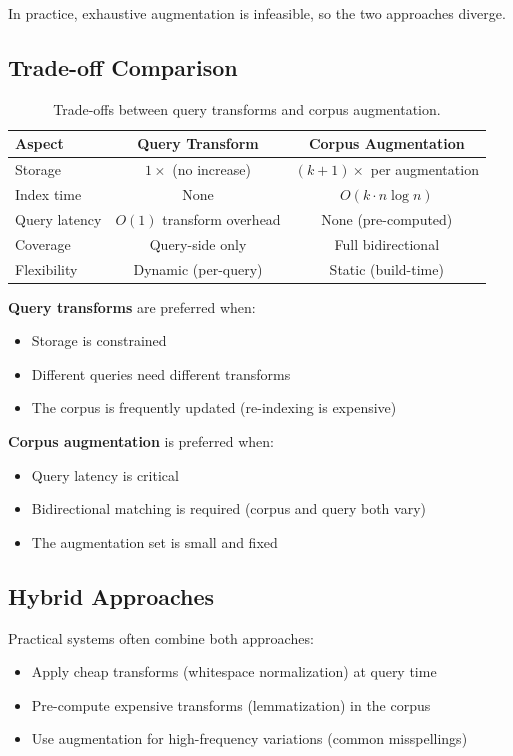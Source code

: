 \documentclass[11pt]{article}
\begin{document}
In practice, exhaustive augmentation is infeasible, so the two approaches diverge.

\subsection{Trade-off Comparison}

\begin{table}[h]
\centering
\begin{tabular}{lcc}
\toprule
\textbf{Aspect} & \textbf{Query Transform} & \textbf{Corpus Augmentation} \\
\midrule
Storage & $1\times$ (no increase) & $(k+1)\times$ per augmentation \\
Index time & None & $O(k \cdot n \log n)$ \\
Query latency & $O(1)$ transform overhead & None (pre-computed) \\
Coverage & Query-side only & Full bidirectional \\
Flexibility & Dynamic (per-query) & Static (build-time) \\
\bottomrule
\end{tabular}
\caption{Trade-offs between query transforms and corpus augmentation.}
\label{tab:tradeoffs}
\end{table}

\textbf{Query transforms} are preferred when:
\begin{itemize}
    \item Storage is constrained
    \item Different queries need different transforms
    \item The corpus is frequently updated (re-indexing is expensive)
\end{itemize}

\textbf{Corpus augmentation} is preferred when:
\begin{itemize}
    \item Query latency is critical
    \item Bidirectional matching is required (corpus and query both vary)
    \item The augmentation set is small and fixed
\end{itemize}

\subsection{Hybrid Approaches}

Practical systems often combine both approaches:
\begin{itemize}
    \item Apply cheap transforms (whitespace normalization) at query time
    \item Pre-compute expensive transforms (lemmatization) in the corpus
    \item Use augmentation for high-frequency variations (common misspellings)
\end{itemize}
\end{document}
